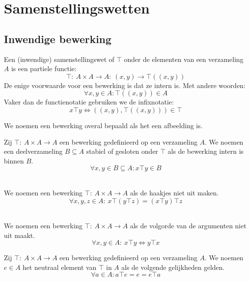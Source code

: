 \documentclass[main.tex]{subfiles}
\begin{document}
\chapter{Samenstellingswetten}
\label{cha:samenstellingswetten}

\section{Inwendige bewerking}
\label{sec:inwendige-bewerking}

\begin{de}
  Een (inwendige) samenstellingswet of  $\top$ onder de elementen van een verzameling $A$ is een partiele functie:
  \[ \top:\ A\times A \rightarrow A:\ (x,y) \rightarrow \top((x,y)) \]
  De enige voorwaarde voor een bewerking is dat ze intern is.
  Met andere woorden:
  \[ \forall x,y \in A: \top((x,y)) \in A \]
  Vaker dan de functienotatie gebruiken we de infixnotatie:
  \[ x \top y \Leftrightarrow  ((x,y),\top((x,y))) \in \top \]
\end{de}

\begin{de}
  We noemen een bewerking overal bepaald als het een afbeelding is.
\end{de}

\begin{de}
  Zij $\top:\ A\times A\rightarrow A$ een bewerking gedefinieerd op een verzameling $A$.
  We noemen een deelverzameling $B\subseteq A$ stabiel of gesloten onder $\top$ als de bewerking intern is binnen $B$.
  \[ \forall x,y \in B\subseteq A: x \top y \in B \]
\end{de}

\begin{de}
  \\
  We noemen een bewerking $\top:\ A\times A\rightarrow A$  als de haakjes niet uit maken.
  \[ \forall x,y,z \in A:\ x\top(y\top z) = (x\top y) \top z \]
\end{de}

\begin{de}
  \\
  We noemen een bewerking $\top:\ A\times A\rightarrow A$  als de volgorde van de argumenten niet uit maakt.
  \[ \forall x,y \in A:\ x \top y \Leftrightarrow y \top x \]
\end{de}

\begin{de}
  Zij $\top:\ A\times A\rightarrow A$ een bewerking gedefinieerd op een verzameling $A$.
  We noemen $e\in A$ het neutraal element van $\top$ in $A$ als de volgende gelijkheden gelden.
  \[ \forall a \in A: a\top e = e = e\top a \]
\end{de}
\end{document}
